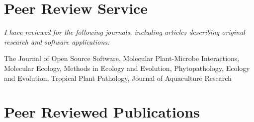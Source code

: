 
\section{Peer Review Service}

\textit{I have reviewed for the following journals, including articles describing
original research and software applications:}

The Journal of Open Source Software, Molecular Plant-Microbe Interactions,
Molecular Ecology, Methods in Ecology and Evolution, Phytopathology, Ecology
and Evolution, Tropical Plant Pathology, Journal of Aquaculture Research

\section{Peer Reviewed Publications}

